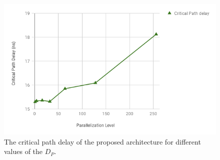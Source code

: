 \begin{figure}[t!]
\begin{center}
\includegraphics[clip,width=1\linewidth]{Fig/CriticalPathDelay_ParallelizationLevel.png}
\caption{The critical path delay of the proposed architecture for different values of the $D_P$. }
\label{fig:CriticalPath}
\end{center}
\end{figure}



